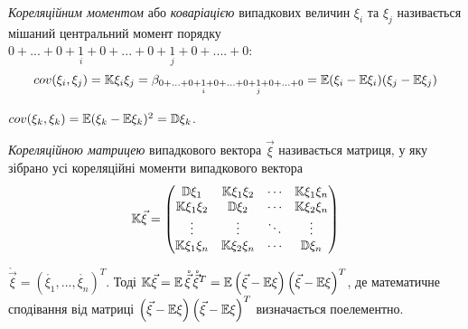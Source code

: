 \begin{definition}
    \emph{Кореляційним моментом} або 
    \emph{коваріацією} випадкових величин 
    $\xi_i$ та $\xi_j$ називається мішаний 
    центральний момент 
    порядку
    $0+...+0+\underset{i}{1}+0+...+0+\underset{j}{1}+0+....+0$:
    \begin{equation*}
        {cov}(\xi_i,\xi_j) = \mathbb{K}\xi_i\xi_j = \beta_{0+...+0+\underset{i}{1}+0+...
        +0+\underset{j}{1}+0+...+0}
        =
        \mathbb{E}(\xi_i-\mathbb{E}\xi_i)(\xi_j-\mathbb{E}\xi_j)
    \end{equation*}
\end{definition}
\begin{remark}
    ${cov}(\xi_k, \xi_k) = \mathbb{E}(\xi_k-\mathbb{E}\xi_k)^2 = \mathbb{D}\xi_k$.
\end{remark}
\begin{definition}
   \emph{Кореляційною матрицею} випадкового 
   вектора $\vec{\xi}$ називається матриця, у яку зібрано усі 
   кореляційні моменти випадкового вектора
   \begin{equation*}
       \mathbb{K}\vec{\xi} = 
       \begin{pmatrix}
           \mathbb{D}\xi_1 & \mathbb{K}\xi_1\xi_2 & \cdots & \mathbb{K}\xi_1\xi_n \\
           \mathbb{K}\xi_1\xi_2 & \mathbb{D}\xi_2 & \cdots & \mathbb{K}\xi_2\xi_n \\
           \vdots & \vdots & \ddots & \vdots \\
           \mathbb{K}\xi_1\xi_n & \mathbb{K}\xi_2\xi_n & \cdots & \mathbb{D}\xi_n
       \end{pmatrix}
   \end{equation*} 
\end{definition}
\begin{remark}
    $\mathring{\vec{\xi}} = \left(\mathring{\xi_1}, ..., \mathring{\xi_n}
    \right)^T$.
    Тоді $\mathbb{K}\vec{\xi} = \mathbb{E}\,\mathring{\vec{\xi}}\,\mathring{\vec{\xi}}^T = \mathbb{E} \left(\vec{\xi} - \mathbb{E}\xi\right)\left(\vec{\xi} - \mathbb{E}\xi\right)^T$,
    де математичне сподівання від матриці $\left(\vec{\xi} - \mathbb{E}\xi\right)\left(\vec{\xi} - \mathbb{E}\xi\right)^T$ визначається поелементно.
\end{remark}

